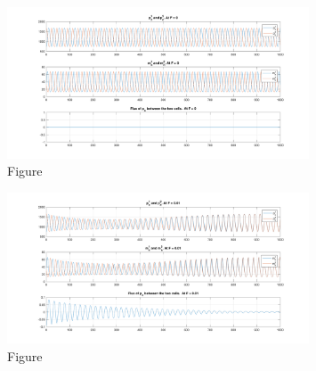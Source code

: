 \documentclass[12pt]{article}
\renewcommand{\(}{\left (}
\renewcommand{\)}{\right )}
\begin{document}
\begin{figure}[ht]
    \centering
	\begin{minipage}{0.99\textwidth}
		\centering
		\includegraphics[width=0.8\textwidth]{two_cell_same_period_diff_states_F0.png}
		\caption*{\small Figure}
	\end{minipage}
\end{figure}

\begin{figure}[ht]
    \centering
	\begin{minipage}{0.99\textwidth}
		\centering
		\includegraphics[width=0.8\textwidth]{two_cell_same_period_diff_states_F01.png}
		\caption*{\small Figure}
	\end{minipage}
\end{figure}
\end{document}
